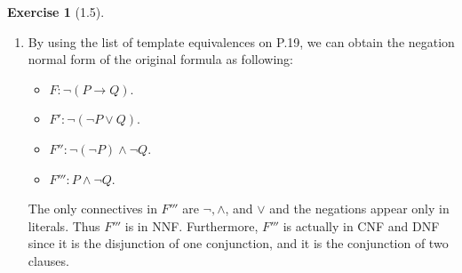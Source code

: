 \documentclass[12pt, psamsfonts]{amsart}
\theoremstyle{definition}
\newtheorem*{exer}{Exercise}
\theoremstyle{remark}
\numberwithin{equation}{subsection}
\begin{document}
\begin{exer}[1.5]
    $ $
    \begin{enumerate}[label=(\alph*)]
        \item
            By using the list of template equivalences on P.19, we can obtain the negation normal form of the original formula as following:
            \begin{itemize}
                \item
                    $F: \neg (P \rightarrow Q)$.
                \item
                    $F': \neg (\neg P \lor Q)$.
                \item
                    $F'': \neg (\neg P) \land \neg Q$.
                \item
                    $F''': P \land \neg Q$.
            \end{itemize}
            The only connectives in $F'''$ are $\neg, \land$, and $\lor$ and the negations appear only in literals.
            Thus $F'''$ is in NNF.
            Furthermore, $F'''$ is actually in CNF and DNF since it is the disjunction of one conjunction, and it is the conjunction of two clauses.
    \end{enumerate}
\end{exer}
\end{document}
